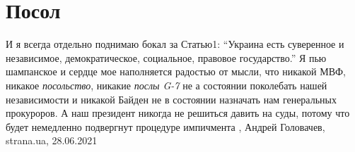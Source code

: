  
 
 
 
 
\chapter{Посол}

И я всегда отдельно поднимаю бокал за Статью1: \enquote{Украина есть суверенное
и независимое, демократическое, социальное, правовое государство.} Я пью
шампанское и сердце мое наполняется радостью от мысли, что никакой МВФ, никакое
\emph{посольство}, никакие \emph{послы G-7} не а состоянии поколебать нашей независимости и
никакой Байден не в состоянии назначать нам генеральных прокуроров. А наш
президент никогда не решиться давить на суды, потому что будет немедленно
подвергнут процедуре импичмента
, 
Андрей Головачев, strana.ua, 28.06.2021
